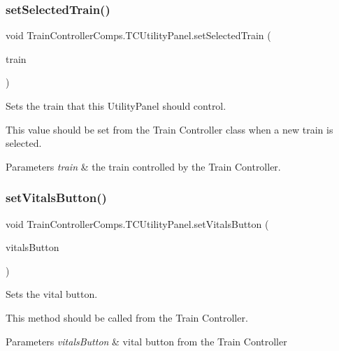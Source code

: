\subsubsection{\texorpdfstring{set\+Selected\+Train()}{setSelectedTrain()}}
{\footnotesize\ttfamily void Train\+Controller\+Comps.\+T\+C\+Utility\+Panel.\+set\+Selected\+Train (\begin{DoxyParamCaption}\item[{\hyperlink{classTrainControllerComps_1_1TestTrain}{Test\+Train}}]{train }\end{DoxyParamCaption})}



Sets the train that this Utility\+Panel should control. 

This value should be set from the Train Controller class when a new train is selected.


\begin{DoxyParams}{Parameters}
{\em train} & the train controlled by the Train Controller. \\
\hline
\end{DoxyParams}
\mbox{\label{classTrainControllerComps_1_1TCUtilityPanel_a3ec60489defa395e8f003d8f56ba4aab}} 
\subsubsection{\texorpdfstring{set\+Vitals\+Button()}{setVitalsButton()}}
{\footnotesize\ttfamily void Train\+Controller\+Comps.\+T\+C\+Utility\+Panel.\+set\+Vitals\+Button (\begin{DoxyParamCaption}\item[{J\+Button}]{vitals\+Button }\end{DoxyParamCaption})}



Sets the vital button. 

This method should be called from the Train Controller.


\begin{DoxyParams}{Parameters}
{\em vitals\+Button} & vital button from the Train Controller \\
\hline
\end{DoxyParams}
\mbox{\label{classTrainControllerComps_1_1TCUtilityPanel_abd1bf68cdc09c79e45c5e1792961ce49}} 
